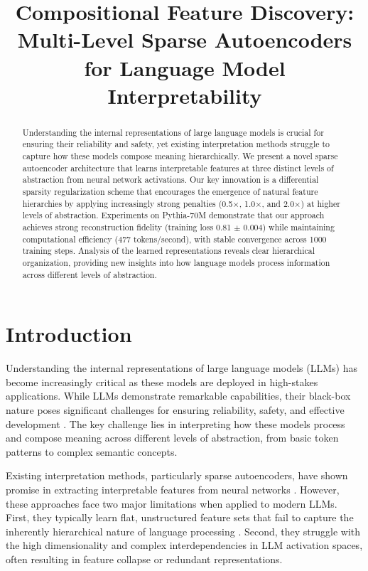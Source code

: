 \title{Compositional Feature Discovery: Multi-Level Sparse Autoencoders for Language Model Interpretability}


\begin{abstract}
Understanding the internal representations of large language models is crucial for ensuring their reliability and safety, yet existing interpretation methods struggle to capture how these models compose meaning hierarchically. We present a novel sparse autoencoder architecture that learns interpretable features at three distinct levels of abstraction from neural network activations. Our key innovation is a differential sparsity regularization scheme that encourages the emergence of natural feature hierarchies by applying increasingly strong penalties (0.5$\times$, 1.0$\times$, and 2.0$\times$) at higher levels of abstraction. Experiments on Pythia-70M demonstrate that our approach achieves strong reconstruction fidelity (training loss 0.81 $\pm$ 0.004) while maintaining computational efficiency (477 tokens/second), with stable convergence across 1000 training steps. Analysis of the learned representations reveals clear hierarchical organization, providing new insights into how language models process information across different levels of abstraction.
\end{abstract}

\section{Introduction}
Understanding the internal representations of large language models (LLMs) has become increasingly critical as these models are deployed in high-stakes applications. While LLMs demonstrate remarkable capabilities, their black-box nature poses significant challenges for ensuring reliability, safety, and effective development \cite{elhage2022solu}. The key challenge lies in interpreting how these models process and compose meaning across different levels of abstraction, from basic token patterns to complex semantic concepts.

Existing interpretation methods, particularly sparse autoencoders, have shown promise in extracting interpretable features from neural networks \cite{Cunningham2023SparseAF,anthropic2022decomposition}. However, these approaches face two major limitations when applied to modern LLMs. First, they typically learn flat, unstructured feature sets that fail to capture the inherently hierarchical nature of language processing \cite{Olshausen1996EmergenceOS}. Second, they struggle with the high dimensionality and complex interdependencies in LLM activation spaces, often resulting in feature collapse or redundant representations.

